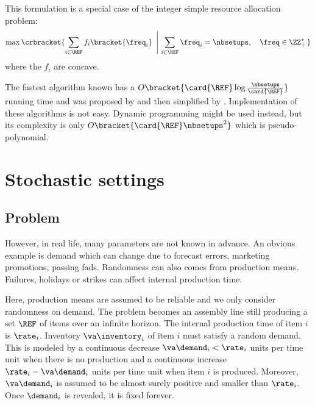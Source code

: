\medskip


This formulation is a special case of the integer simple resource allocation problem:
\begin{equation}
  \max\crbracket{\sum_{i\in\REF} f_i\bracket{\freq_i}\ \left|\ \sum_{i\in\REF}\freq_i=\nbsetups,\quad\freq\in \ZZ_+^*\right.}
\end{equation}
where the $f_i$ are concave.


The fastest algorithm known has a $O\bracket{\card{\REF}\log{\frac{\nbsetups}{\card{\REF}}}}$ running time and was proposed by \citet{Frederickson1982} and then simplified by \citet{Hochbaum1994}.
Implementation of these algorithms is not easy.
Dynamic programming might be used instead, but its complexity is only $O\bracket{\card{\REF}\nbsetups^2}$ which is pseudo-polynomial.



\section{Stochastic settings}


\subsection{Problem}
\label{sec:lot-size:single-line:stochastic:problem}


However, in real life, many parameters are not known in advance.
An obvious example is demand which can change due to forecast errors, marketing promotions, passing fads.
Randomness can also comes from production means.
Failures, holidays or strikes can affect internal production time.


Here, production means are assumed to be reliable and we only consider randomness on demand.
The problem becomes an assembly line still producing a set $\REF$ of items over an infinite horizon.
The internal production time of item $i$ is $\rate_i$.
Inventory $\va\inventory_i$ of item $i$ must satisfy a random demand.
This is modeled by a continuous decrease $\va\demand_i<\rate_i$ units per time unit when there is no production and a continuous increase $\rate_i-\va\demand_i$ units per time unit when item $i$ is produced.
Moreover, $\va\demand_i$ is assumed to be almost surely positive and smaller than $\rate_i$.
Once $\demand_i$ is revealed, it is fixed forever.


